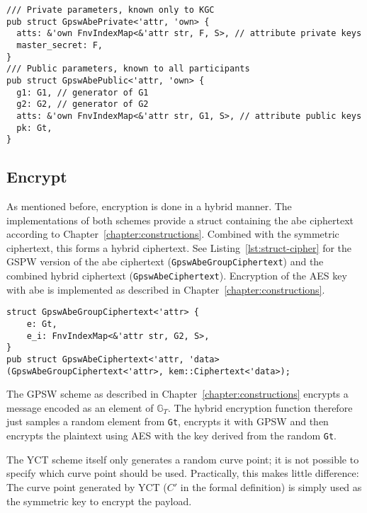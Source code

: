 \begin{lstlisting}[float=h,caption={Private and public system parameters structs for GPSW},label={lst:struct-pubkey}]
/// Private parameters, known only to KGC
pub struct GpswAbePrivate<'attr, 'own> {
  atts: &'own FnvIndexMap<&'attr str, F, S>, // attribute private keys
  master_secret: F,
}
/// Public parameters, known to all participants
pub struct GpswAbePublic<'attr, 'own> {
  g1: G1, // generator of G1
  g2: G2, // generator of G2
  atts: &'own FnvIndexMap<&'attr str, G1, S>, // attribute public keys
  pk: Gt,
}
\end{lstlisting}

\subsection{Encrypt}
As mentioned before, encryption is done in a hybrid manner.
The implementations of both schemes provide a struct containing the \acrshort{abe} ciphertext according to Chapter~\ref{chapter:constructions}.
Combined with the symmetric ciphertext, this forms a hybrid ciphertext.
See Listing~\ref{lst:struct-cipher} for the GSPW version of the \acrshort{abe} ciphertext (\verb+GpswAbeGroupCiphertext+) and the combined hybrid ciphertext (\verb+GpswAbeCiphertext+).
Encryption of the AES key with \acrshort{abe} is implemented as described in Chapter~\ref{chapter:constructions}.

\begin{lstlisting}[float=h,caption={ABE ciphertext structure for GPSW},label={lst:struct-cipher}, breaklines=true]
struct GpswAbeGroupCiphertext<'attr> {
    e: Gt, 
    e_i: FnvIndexMap<&'attr str, G2, S>,
}
pub struct GpswAbeCiphertext<'attr, 'data>(GpswAbeGroupCiphertext<'attr>, kem::Ciphertext<'data>);
\end{lstlisting}
The GPSW scheme as described in Chapter~\ref{chapter:constructions} encrypts a message encoded as an element of $\mathbb{G}_T$.
The hybrid encryption function therefore just samples a random element from \texttt{Gt}, encrypts it with GPSW and then encrypts the plaintext using AES with the key derived from the random \texttt{Gt}.

The YCT scheme itself only generates a random curve point; it is not possible to specify which curve point should be used.
Practically, this makes little difference:
The curve point generated by YCT ($C'$ in the formal definition) is simply used as the symmetric key to encrypt the payload.
  


